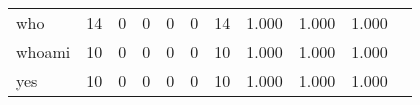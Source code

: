 \begin{longtable}{lp{1.20cm}p{1.20cm}p{1.20cm}p{1.20cm}p{1.20cm}p{1.20cm}p{1.20cm}p{1.20cm}p{1.20cm}p{1.20cm}}
who       &                                    14 &                                                  0 &                                                  0 &                                                  0 &                                                  0 &                                                 14 &                                         1.000 &                                              1.000 &                                              1.000 \\
whoami    &                                    10 &                                                  0 &                                                  0 &                                                  0 &                                                  0 &                                                 10 &                                         1.000 &                                              1.000 &                                              1.000 \\
yes       &                                    10 &                                                  0 &                                                  0 &                                                  0 &                                                  0 &                                                 10 &                                         1.000 &                                              1.000 &                                              1.000 \\
\end{longtable}
